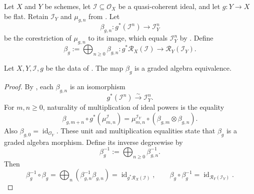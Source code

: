 \begin{definition}
  \label{def:nagata-flat-pullback-rees-map}
  \lean{}

  Let $X$ and $Y$ be schemes, let
  $\mathcal I\subseteq\mathcal O_X$ be a quasi-coherent ideal, and let
  $g\colon Y\to X$ be flat.  Retain $\mathcal I_Y$ and $\mu_{g,n}$ from
  .  Let
  \[
    \beta_{g,n}\colon g^*(\mathcal I^n)\longrightarrow\mathcal I_Y^n
  \]
  be the corestriction of $\mu_{g,n}$ to its image, which equals
  $\mathcal I_Y^n$ by
  .  Define
  \[
    \beta_g:=\bigoplus_{n\ge0}\beta_{g,n}\colon
      g^*\mathcal R_X(\mathcal I)\longrightarrow
      \mathcal R_Y(\mathcal I_Y).
  \]
\end{definition}

\begin{lemma}
  \label{lemma:nagata-flat-pullback-rees}
  \lean{}

  Let $X,Y,\mathcal I,g$ be the data of
  .  The map $\beta_g$ is a graded
  algebra equivalence.
\end{lemma}

\begin{proof}
  By , each
  $\beta_{g,n}$ is an isomorphism
  \[
    g^*(\mathcal I^n)\xrightarrow{\sim}\mathcal I_Y^n.
  \]
  For $m,n\ge0$, naturality of multiplication of ideal powers is the
  equality
  \[
    \beta_{g,m+n}\circ g^*(\mu^{\mathcal I}_{m,n})
      =\mu^{\mathcal I_Y}_{m,n}\circ
        (\beta_{g,m}\otimes\beta_{g,n}).
  \]
  Also $\beta_{g,0}=\operatorname{id}_{\mathcal O_Y}$.  These unit and
  multiplication equalities state that $\beta_g$ is a graded algebra
  morphism.  Define its inverse degreewise by
  \[
    \beta_g^{-1}:=\bigoplus_{n\ge0}\beta_{g,n}^{-1}.
  \]
  Then
  \[
    \beta_g^{-1}\circ\beta_g
      =\bigoplus_n(\beta_{g,n}^{-1}\beta_{g,n})
      =\operatorname{id}_{g^*\mathcal R_X(\mathcal I)},
    \qquad
    \beta_g\circ\beta_g^{-1}
      =\operatorname{id}_{\mathcal R_Y(\mathcal I_Y)}.
  \]
\end{proof}


